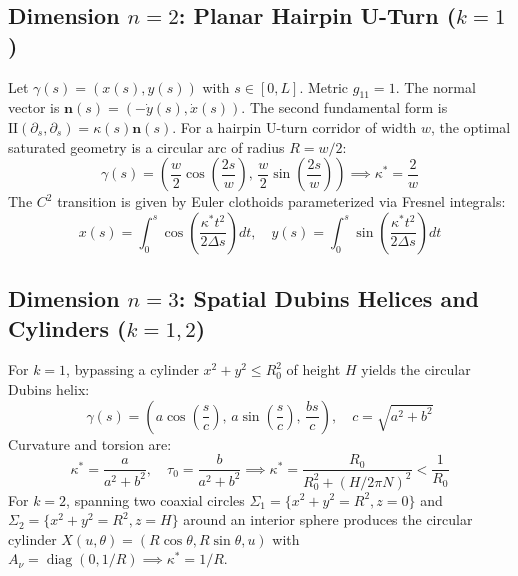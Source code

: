 \documentclass[11pt,reqno]{amsart}
\theoremstyle{definition}
\providecommand{\II}{\mathrm{I\!I}}
\numberwithin{equation}{section}
\providecommand{\II}{\mathrm{II}}
\begin{document}
\subsection{Dimension \texorpdfstring{$n=2$}{n=2}: Planar Hairpin U-Turn \texorpdfstring{($k=1$)}{(k=1)}}
Let $\gamma(s) = (x(s), y(s))$ with $s \in [0, L]$. Metric $g_{11} = 1$. The normal vector is $\mathbf{n}(s) = (-\dot{y}(s), \dot{x}(s))$. The second fundamental form is $\II(\partial_s, \partial_s) = \kappa(s) \mathbf{n}(s)$. 
For a hairpin U-turn corridor of width $w$, the optimal saturated geometry is a circular arc of radius $R = w/2$:
\begin{equation}
\gamma(s) = \left( \frac{w}{2} \cos\left(\frac{2s}{w}\right), \, \frac{w}{2} \sin\left(\frac{2s}{w}\right) \right) \implies \kappa^* = \frac{2}{w}
\end{equation}
The $C^2$ transition is given by Euler clothoids parameterized via Fresnel integrals:
\begin{equation}
x(s) = \int_0^s \cos\left(\frac{\kappa^* t^2}{2 \Delta s}\right) dt, \quad y(s) = \int_0^s \sin\left(\frac{\kappa^* t^2}{2 \Delta s}\right) dt
\end{equation}

\subsection{Dimension \texorpdfstring{$n=3$}{n=3}: Spatial Dubins Helices and Cylinders \texorpdfstring{($k=1, 2$)}{(k=1, 2)}}
For $k=1$, bypassing a cylinder $x^2+y^2 \le R_0^2$ of height $H$ yields the circular Dubins helix:
\begin{equation}
\gamma(s) = \left( a \cos\left(\frac{s}{c}\right), \, a \sin\left(\frac{s}{c}\right), \, \frac{b s}{c} \right), \quad c = \sqrt{a^2 + b^2}
\end{equation}
Curvature and torsion are:
\begin{equation}
\kappa^* = \frac{a}{a^2 + b^2}, \quad \tau_0 = \frac{b}{a^2 + b^2} \implies \kappa^* = \frac{R_0}{R_0^2 + (H/2\pi N)^2} < \frac{1}{R_0}
\end{equation}
For $k=2$, spanning two coaxial circles $\Sigma_1 = \{x^2+y^2=R^2, z=0\}$ and $\Sigma_2 = \{x^2+y^2=R^2, z=H\}$ around an interior sphere produces the circular cylinder $X(u,\theta) = (R\cos\theta, R\sin\theta, u)$ with $A_\nu = \operatorname{diag}(0, 1/R) \implies \kappa^* = 1/R$.
\end{document}
